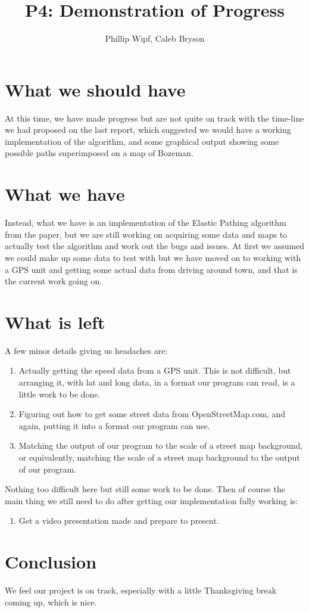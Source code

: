 \documentclass[11pt]{article}
\title{P4: Demonstration of Progress}
\author{Phillip Wipf, Caleb Bryson}
\begin{document}
\maketitle
\section{What we should have}

At this time, we have made progress but are not quite on track with the time-line we had proposed on the last report, which suggested we would have a working implementation of the algorithm, and some graphical output showing some possible paths superimposed on a map of Bozeman.

\section{What we have}
Instead, what we have is an implementation of the Elastic Pathing algorithm from the paper, but we are still working on acquiring some data and maps to actually test the algorithm and work out the bugs and issues. At first we assumed we could make up some data to test with but we have moved on to working with a GPS unit and getting some actual data from driving around town, and that is the current work going on.

\section{What is left}
A few minor details giving us headaches are:
\begin{enumerate}
\item Actually getting the speed data from a GPS unit. This is not difficult, but arranging it, with lat and long data, in a format our program can read, is a little work to be done.
\item Figuring out how to get some street data from OpenStreetMap.com, and again, putting it into a format our program can use.
\item Matching the output of our program to the scale of a street map background, or equivalently, matching the scale of a street map background to the output of our program.
\end{enumerate}
Nothing too difficult here but still some work to be done. \newline\newline
Then of course the main thing we still need to do after getting our implementation fully working is:
\begin{enumerate}
\item Get a video presentation made and prepare to present.
\end{enumerate}
\section{Conclusion}
We feel our project is on track, especially with a little Thanksgiving break coming up, which is nice.
\end{document}
